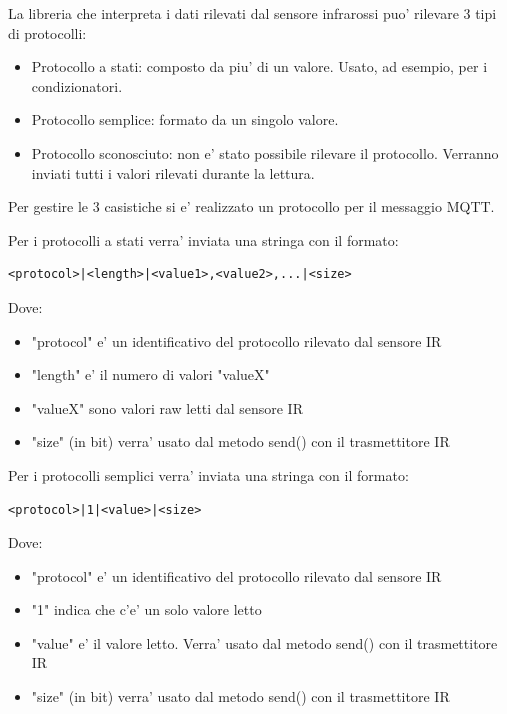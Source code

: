 \documentclass[a4paper,11pt]{article}
\begin{document}
    La libreria che interpreta i dati rilevati dal sensore infrarossi puo' rilevare 3 tipi di protocolli:
    \begin{itemize}
        \item Protocollo a stati: composto da piu' di un valore. Usato, ad esempio, per i condizionatori.
        \item Protocollo semplice: formato da un singolo valore.
        \item Protocollo sconosciuto: non e' stato possibile rilevare il protocollo. Verranno inviati tutti i valori rilevati durante la lettura.
    \end{itemize}

    Per gestire le 3 casistiche si e' realizzato un protocollo per il messaggio MQTT.

    Per i protocolli a stati verra' inviata una stringa con il formato:

    \begin{verbatim}
<protocol>|<length>|<value1>,<value2>,...|<size>
    \end{verbatim}
            
    Dove:
    \begin{itemize}
        \item "protocol" e' un identificativo del protocollo rilevato dal sensore IR
        \item "length" e' il numero di valori "valueX"
        \item "valueX" sono valori raw letti dal sensore IR
        \item "size" (in bit) verra' usato dal metodo send() con il trasmettitore IR
    \end{itemize}

    Per i protocolli semplici verra' inviata una stringa con il formato:

    \begin{verbatim}
<protocol>|1|<value>|<size>
    \end{verbatim}

    Dove:
    \begin{itemize}
        \item "protocol" e' un identificativo del protocollo rilevato dal sensore IR
        \item "1" indica che c'e' un solo valore letto
        \item "value" e' il valore letto. Verra' usato dal metodo send() con il trasmettitore IR
        \item "size" (in bit) verra' usato dal metodo send() con il trasmettitore IR
    \end{itemize}
\end{document}
